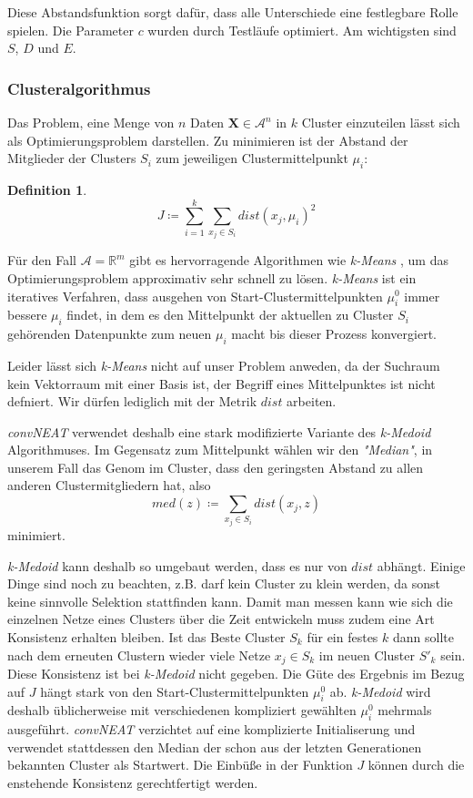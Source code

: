 \documentclass[]{scrartcl}
\newtheorem{defi}[satz]{Definition}
\begin{document}
				Diese Abstandsfunktion sorgt dafür, dass alle Unterschiede eine festlegbare Rolle spielen.
				Die Parameter $c$ wurden durch Testläufe optimiert. Am wichtigsten sind $S$, $D$ und $E$.

			\subsubsection{Clusteralgorithmus}
				
				Das Problem, eine Menge von $n$ Daten $\mathbf{X} \in \mathcal{A}^n$ in $k$ Cluster einzuteilen lässt sich als Optimierungsproblem darstellen. Zu minimieren ist der
				Abstand der Mitglieder der Clusters $S_i$ zum jeweiligen Clustermittelpunkt $\mu_i$:

				\begin{defi}
					$$J \coloneqq \sum _{i=1}^{k}\sum _{x_j \in S_i} dist(x_j, \mu_i)^2$$
				\end{defi}

				Für den Fall $\mathcal{A} = \mathbb{R}^m$ gibt es hervorragende Algorithmen wie \textit{k-Means} \cite{kmeans}, um das Optimierungsproblem
				approximativ sehr schnell zu lösen. \textit{k-Means} ist ein iteratives Verfahren, dass ausgehen von Start-Clustermittelpunkten $\mu_i^0$
				immer bessere $\mu_i$ findet, in dem es den Mittelpunkt der aktuellen zu Cluster $S_i$ gehörenden Datenpunkte zum neuen $\mu_i$ macht bis dieser Prozess konvergiert.

				Leider lässt sich \textit{k-Means} nicht auf unser Problem anweden, da der Suchraum kein Vektorraum mit einer Basis ist,
				der Begriff eines Mittelpunktes ist nicht defniert. Wir dürfen lediglich mit der Metrik $dist$ arbeiten.

				\textit{convNEAT} verwendet deshalb eine stark modifizierte Variante des \textit{k-Medoid} Algorithmuses.
				Im Gegensatz zum Mittelpunkt wählen wir den \textit{"Median"}, in unserem Fall das Genom im Cluster, dass den geringsten Abstand zu allen anderen
				Clustermitgliedern hat, also $$med(z) \coloneqq \sum _{x_j \in S_i} dist(x_j, z)$$ minimiert.

				\textit{k-Medoid} kann deshalb so umgebaut werden, dass es nur von $dist$ abhängt.
				Einige Dinge sind noch zu beachten, z.B. darf kein Cluster zu klein werden, da sonst keine sinnvolle Selektion stattfinden kann.
				Damit man messen kann wie sich die einzelnen Netze eines Clusters über die Zeit entwickeln muss zudem eine Art Konsistenz erhalten bleiben.
				Ist das Beste Cluster $S_k$ für ein festes $k$ dann sollte nach dem erneuten Clustern wieder viele Netze $x_j \in S_k$ im neuen Cluster $S'_k$ sein.
				Diese Konsistenz ist bei \textit{k-Medoid} nicht gegeben. Die Güte des Ergebnis im Bezug auf $J$ hängt stark von den Start-Clustermittelpunkten $\mu_i^0$
				ab. \textit{k-Medoid} wird deshalb üblicherweise mit verschiedenen kompliziert gewählten $\mu_i^0$ mehrmals ausgeführt.
				\textit{convNEAT} verzichtet auf eine komplizierte Initialiserung und verwendet stattdessen den Median der schon aus der letzten Generationen
				bekannten Cluster als Startwert. Die Einbüße in der Funktion $J$ können durch die enstehende Konsistenz gerechtfertigt werden.
\end{document}
